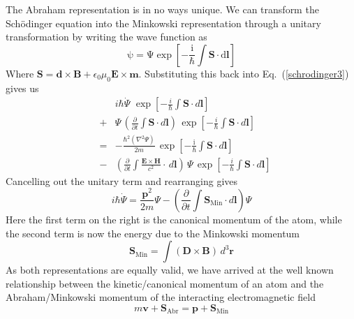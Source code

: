  The Abraham representation is in no ways unique.  We can transform the Sch\"{o}dinger equation into the Minkowski representation through a unitary transformation by writing the wave function as
\begin{equation}
\mathrm{\psi=\Psi\exp{\left[-\frac{\mathrm{i}}{\mathrm{\hbar}}\int\mathbf{S}\cdot d\mathbf{l}\right]}}
\label{minkrep}
\end{equation}
Where $\mathbf{S}=\mathbf{d}\times\mathbf{B}+\epsilon_0\mu_0\mathbf{E}\times\mathbf{m}$. Substituting this back into Eq.\ (\ref{schrodinger3}) gives us
\begin{eqnarray}
&&i\hbar\dot{\Psi}\,\,\exp{\left[-\frac{i}{\hbar}\int\mathbf{S}\cdot d\mathbf{l}\right]} \nonumber \\
&+&\Psi\,\left(\frac{\partial}{\partial t}\int\mathbf{S}\cdot d\mathbf{l}\right)\,\exp{\left[-\frac{i}{\hbar}\int\mathbf{S}\cdot d\mathbf{l}\right]}\nonumber \\
&=&-\frac{\hbar^2\left(\nabla^2\Psi\right)}{2m}\,\exp{\left[-\frac{\mathrm{i}}{\hbar}\int\mathbf{S}\cdot d\mathbf{l}\right]} \nonumber\\
&-& \left(\frac{\partial}{\partial t}\int\frac{\mathbf{E}\times\mathbf{H}}{c^2}\cdot\,d\mathbf{l}\right)\,\Psi\,\exp{\left[-\frac{i}{\hbar}\int\mathbf{S}\cdot d\mathbf{l}\right]}
\label{schrodinger4}
\end{eqnarray}
Cancelling out the unitary term and rearranging gives
\begin{equation}
i\hbar\dot{\Psi}=\frac{\mathbf{p}^2}{2m}\Psi 
 -\left(\frac{\partial}{\partial t}\int \mathbf{S}_{\mathrm{Min}}\cdot d\mathbf{l}\right)\Psi 
\label{schrodinger5}
\end{equation}
Here the first term on the right is the canonical momentum of the atom, while the second term is now the energy due to the Minkowski momentum
\begin{equation}
\mathbf{S}_{\mathrm{Min}}=\int\left(\mathbf{D}\times\mathbf{B}\right)\,d^3\mathbf{r}
\end{equation}
  As both representations are equally valid, we have arrived at the well known relationship between the kinetic/canonical momentum of an atom and the Abraham/Minkowski momentum of the interacting electromagnetic field
\begin{equation}
m\mathbf{v}+\mathbf{S}_{\mathrm{Abr}}=\mathbf{p}+\mathbf{S}_{\mathrm{Min}}
\end{equation}

\vspace{5mm}

